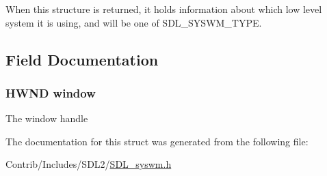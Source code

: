 When this structure is returned, it holds information about which low level system it is using, and will be one of S\+D\+L\+\_\+\+S\+Y\+S\+W\+M\+\_\+\+T\+Y\+PE. 

\subsection{Field Documentation}
\subsubsection[{\texorpdfstring{window}{window}}]{\setlength{\rightskip}{0pt plus 5cm}H\+W\+ND window}\hypertarget{struct_s_d_l___sys_w_minfo_a773143cded4dde4b20b2c5dc501a5b51}{}\label{struct_s_d_l___sys_w_minfo_a773143cded4dde4b20b2c5dc501a5b51}
The window handle 

The documentation for this struct was generated from the following file\+:\begin{DoxyCompactItemize}
\item 
Contrib/\+Includes/\+S\+D\+L2/\hyperlink{_s_d_l__syswm_8h}{S\+D\+L\+\_\+syswm.\+h}\end{DoxyCompactItemize}
